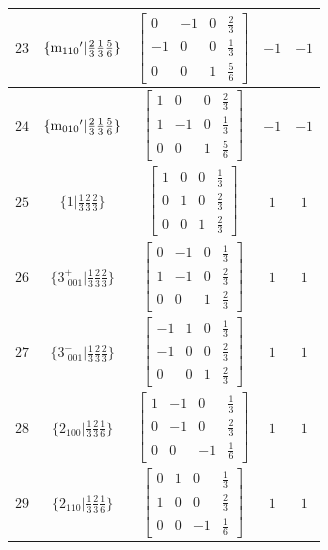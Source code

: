 \documentclass[fleqn,8pt]{jsarticle}
\begin{document}
\begin{longtable}{ccccc}
$ 23 $ & $ \{{\rm m}_{110}{}'|\frac{2}{3} \frac{1}{3} \frac{5}{6}\} $ & $ \begin{bmatrix} 0 & -1 & 0 & \frac{2}{3} \\ -1 & 0 & 0 & \frac{1}{3} \\ 0 & 0 & 1 & \frac{5}{6} \end{bmatrix} $ & $ -1 $ & $ -1 $ \\ \hline
$ 24 $ & $ \{{\rm m}_{010}{}'|\frac{2}{3} \frac{1}{3} \frac{5}{6}\} $ & $ \begin{bmatrix} 1 & 0 & 0 & \frac{2}{3} \\ 1 & -1 & 0 & \frac{1}{3} \\ 0 & 0 & 1 & \frac{5}{6} \end{bmatrix} $ & $ -1 $ & $ -1 $ \\ \hline
$ 25 $ & $ \{1|\frac{1}{3} \frac{2}{3} \frac{2}{3}\} $ & $ \begin{bmatrix} 1 & 0 & 0 & \frac{1}{3} \\ 0 & 1 & 0 & \frac{2}{3} \\ 0 & 0 & 1 & \frac{2}{3} \end{bmatrix} $ & $ 1 $ & $ 1 $ \\ \hline
$ 26 $ & $ \{3^{+}_{\,\,001}|\frac{1}{3} \frac{2}{3} \frac{2}{3}\} $ & $ \begin{bmatrix} 0 & -1 & 0 & \frac{1}{3} \\ 1 & -1 & 0 & \frac{2}{3} \\ 0 & 0 & 1 & \frac{2}{3} \end{bmatrix} $ & $ 1 $ & $ 1 $ \\ \hline
$ 27 $ & $ \{3^{-}_{\,\,001}|\frac{1}{3} \frac{2}{3} \frac{2}{3}\} $ & $ \begin{bmatrix} -1 & 1 & 0 & \frac{1}{3} \\ -1 & 0 & 0 & \frac{2}{3} \\ 0 & 0 & 1 & \frac{2}{3} \end{bmatrix} $ & $ 1 $ & $ 1 $ \\ \hline
$ 28 $ & $ \{2{}_{100}|\frac{1}{3} \frac{2}{3} \frac{1}{6}\} $ & $ \begin{bmatrix} 1 & -1 & 0 & \frac{1}{3} \\ 0 & -1 & 0 & \frac{2}{3} \\ 0 & 0 & -1 & \frac{1}{6} \end{bmatrix} $ & $ 1 $ & $ 1 $ \\ \hline
$ 29 $ & $ \{2{}_{110}|\frac{1}{3} \frac{2}{3} \frac{1}{6}\} $ & $ \begin{bmatrix} 0 & 1 & 0 & \frac{1}{3} \\ 1 & 0 & 0 & \frac{2}{3} \\ 0 & 0 & -1 & \frac{1}{6} \end{bmatrix} $ & $ 1 $ & $ 1 $ \\ \hline

\end{longtable}
\end{document}
